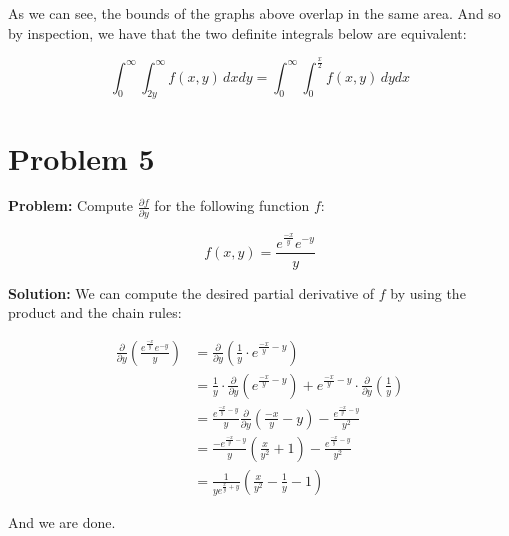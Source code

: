 \documentclass{article}
\begin{document}
\begin{center}
{
    }
\end{center}

As we can see, the bounds of the graphs above overlap in the same area. And so by inspection, we have that the two definite integrals below are equivalent:

$$\int_0^\infty\int_{2y}^\infty f(x,y)\,dxdy=\int_0^\infty\int_{0}^{\frac{x}{2}} f(x,y)\,dydx$$

\section*{Problem 5}
\noindent\textbf{Problem:} Compute $\frac{\partial f}{\partial y}$ for the following function $f$:

$$f(x,y)=\frac{e^{\frac{-x}{y}}e^{-y}}{y}$$

\noindent\textbf{Solution:} We can compute the desired partial derivative of $f$ by using the product and the chain rules:

\begin{align*}
    \frac{\partial}{\partial y}\left(\frac{e^{\frac{-x}{y}}e^{-y}}{y}\right)&=\frac{\partial}{\partial y}\left(\frac{1}{y}\cdot e^{\frac{-x}{y}-y}\right)\\
    &=\frac{1}{y}\cdot\frac{\partial}{\partial y}\left(e^{\frac{-x}{y}-y}\right)+e^{\frac{-x}{y}-y}\cdot\frac{\partial}{\partial y}\left(\frac{1}{y}\right)\\
    &=\frac{e^{\frac{-x}{y}-y}}{y}\frac{\partial}{\partial y}\left(\frac{-x}{y}-y\right)-\frac{e^{\frac{-x}{y}-y}}{y^2}\\
    &=\frac{-e^{\frac{-x}{y}-y}}{y}\left(\frac{x}{y^2}+1\right)-\frac{e^{\frac{-x}{y}-y}}{y^2}\\
    &=\frac{1}{ye^{\frac{x}{y}+y}}\left(\frac{x}{y^2}-\frac{1}{y}-1\right)
\end{align*}

And we are done.
\end{document}
